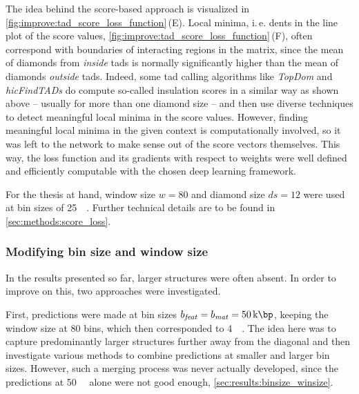 The idea behind the score-based approach is visualized in \cref{fig:improve:tad_score_loss_function}\,(E).
Local minima, i.\,e. dents in the line plot of the score values, \cref{fig:improve:tad_score_loss_function}\,(F),
often correspond with boundaries of interacting regions in the matrix, since the mean of diamonds from \emph{inside} \acrshort{tad}s
is normally significantly higher than the mean of diamonds \emph{outside} \acrshort{tad}s.
Indeed, some \acrshort{tad} calling algorithms like \emph{TopDom} \cite{Shin2015} and \emph{hicFindTADs} \cite[W12f.]{Wolff2018} 
do compute so-called insulation scores in a similar way as shown above -- usually for more than one diamond size -- 
and then use diverse techniques to detect meaningful local minima in the score values.
However, finding meaningful local minima in the given context is computationally involved,
so it was left to the network to make sense out of the score vectors themselves.
This way, the loss function and its gradients with respect to weights were well defined and efficiently computable with the chosen deep learning framework.

For the thesis at hand, window size $w=80$ and diamond size $ds=12$ were used at bin sizes of \SI{25}{\kilo\bp}.
Further technical details are to be found in \cref{sec:methods:score_loss}.

\subsubsection{Modifying bin size and window size}\label{sec:improve:binsize_winsize}
In the results presented so far, larger structures were often absent.
In order to improve on this, two approaches were investigated.

First, predictions were made at bin sizes $b_\mathit{feat} = b_\mathit{mat} = \SI{50}{\kilo\bp}$, 
keeping the window size at 80 bins, which then corresponded to \SI{4}{\mega\bp}.
The idea here was to capture predominantly larger structures further away from the diagonal and
then investigate various methods to combine predictions at smaller and larger bin sizes.
However, such a merging process was never actually developed,
since the predictions at \SI{50}{\kilo\bp} alone were not good enough, \cref{sec:results:binsize_winsize}.

